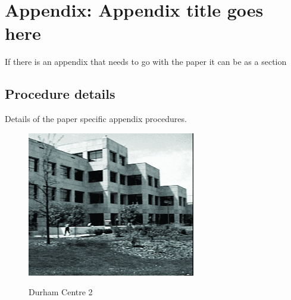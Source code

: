 
\printbibliography[heading=subbibnumbered]

\section{Appendix: Appendix title goes here}
If there is an appendix that needs to go with the paper it can be as a section \autocite{zieglerLecturesPolytopes1995}

\subsection{Procedure details}
Details of the paper specific appendix procedures.
\begin{figure}[h!tb] \centering

    \includegraphics[alt={Here is some alt text}]{Images/dc5}

    \caption{Durham Centre 2}
\end{figure}

\autocite{buiEveryGeneratingPolytope2023}
